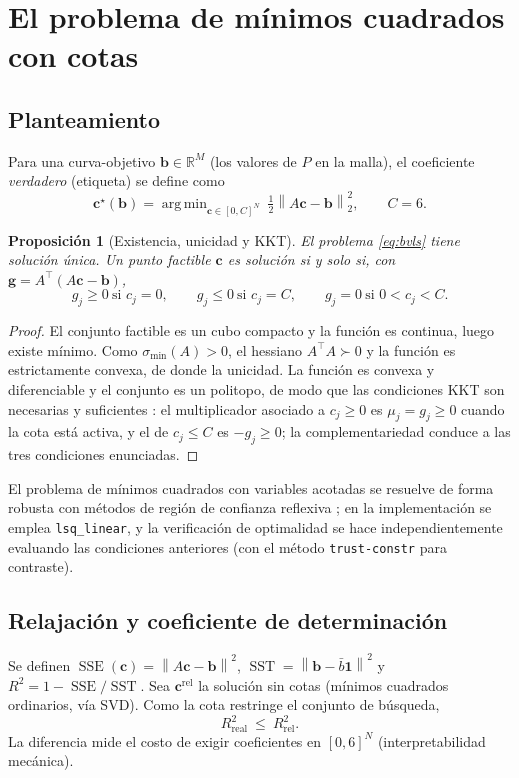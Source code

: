 \documentclass[11pt,twoside]{article}
\newtheorem{proposicion}{Proposición}
\theoremstyle{definition}
\theoremstyle{remark}
\newcommand{\R}{\mathbb{R}}
\newcommand{\norm}[1]{\left\lVert #1\right\rVert}
\DeclareMathOperator*{\argmin}{arg\,min}
\DeclareMathOperator{\SSE}{SSE}
\DeclareMathOperator{\SST}{SST}
\begin{document}
\section{El problema de mínimos cuadrados con cotas}\label{sec:lsq}
\subsection{Planteamiento}
Para una curva-objetivo $\bm b\in\R^M$ (los valores de $P$ en la malla), el coeficiente \emph{verdadero} (etiqueta) se define como
\begin{equation}
 \bm c^\star(\bm b)=\argmin_{\bm c\in[0,C]^N}\ \tfrac12\norm{A\bm c-\bm b}_2^2,\qquad C=6 .
 \label{eq:bvls}
\end{equation}
\begin{proposicion}[Existencia, unicidad y KKT]\label{prop:kkt}
El problema \eqref{eq:bvls} tiene solución única. Un punto factible $\bm c$ es solución si y solo si, con $\bm g=A^{\!\top}(A\bm c-\bm b)$,
\begin{equation}
 g_j\ge0\ \text{si } c_j=0,\qquad g_j\le0\ \text{si } c_j=C,\qquad g_j=0\ \text{si }0<c_j<C .
\end{equation}
\end{proposicion}
\begin{proof}
El conjunto factible es un cubo compacto y la función es continua, luego existe mínimo. Como $\sigma_{\min}(A)>0$, el hessiano $A^{\!\top}A\succ0$ y la función es estrictamente convexa, de donde la unicidad. La función es convexa y diferenciable y el conjunto es un politopo, de modo que las condiciones KKT son necesarias y suficientes \cite{Boyd2004}: el multiplicador asociado a $c_j\ge0$ es $\mu_j=g_j\ge0$ cuando la cota está activa, y el de $c_j\le C$ es $-g_j\ge 0$; la complementariedad conduce a las tres condiciones enunciadas.
\end{proof}
El problema de mínimos cuadrados con variables acotadas se resuelve de forma robusta con métodos de región de confianza reflexiva \cite{Stark1995,Branch1999}; en la implementación se emplea \texttt{lsq\_linear}, y la verificación de optimalidad se hace independientemente evaluando las condiciones anteriores (con el método \texttt{trust-constr} para contraste).

\subsection{Relajación y coeficiente de determinación}
Se definen $\SSE(\bm c)=\norm{A\bm c-\bm b}^2$, $\SST=\norm{\bm b-\bar b\bm 1}^2$ y $R^2=1-\SSE/\SST$. Sea $\bm c^{\mathrm{rel}}$ la solución sin cotas (mínimos cuadrados ordinarios, vía SVD). Como la cota restringe el conjunto de búsqueda,
\begin{equation}
 R^2_{\mathrm{real}}\ \le\ R^2_{\mathrm{rel}} .
\end{equation}
La diferencia mide el costo de exigir coeficientes en $[0,6]^N$ (interpretabilidad mecánica).
\end{document}
